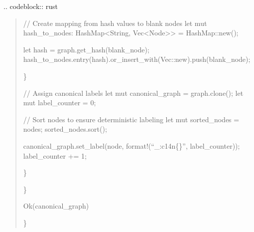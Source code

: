 \documentclass[letterpaper,10pt,english]{sphinxmanual}
\begin{document}
\sphinxAtStartPar
{}
.. code\sphinxhyphen{}block:: rust
\begin{quote}
\begin{description}
\sphinxAtStartPar
// Create mapping from hash values to blank nodes
let mut hash\_to\_nodes: HashMap\textless{}String, Vec\textless{}Node\textgreater{}\textgreater{} = HashMap::new();
\begin{description}
\sphinxAtStartPar
let hash = graph.get\_hash(blank\_node);
hash\_to\_nodes.entry(hash).or\_insert\_with(Vec::new).push(blank\_node);

\end{description}

\sphinxAtStartPar
\}

\sphinxAtStartPar
// Assign canonical labels
let mut canonical\_graph = graph.clone();
let mut label\_counter = 0;
\begin{description}
\sphinxAtStartPar
// Sort nodes to ensure deterministic labeling
let mut sorted\_nodes = nodes;
sorted\_nodes.sort();
\begin{description}
\sphinxAtStartPar
canonical\_graph.set\_label(node, format!(“\_:c14n\{\}”, label\_counter));
label\_counter += 1;

\end{description}

\sphinxAtStartPar
\}

\end{description}

\sphinxAtStartPar
\}

\sphinxAtStartPar
Ok(canonical\_graph)

\end{description}

\sphinxAtStartPar
\}
\end{quote}
\end{document}
